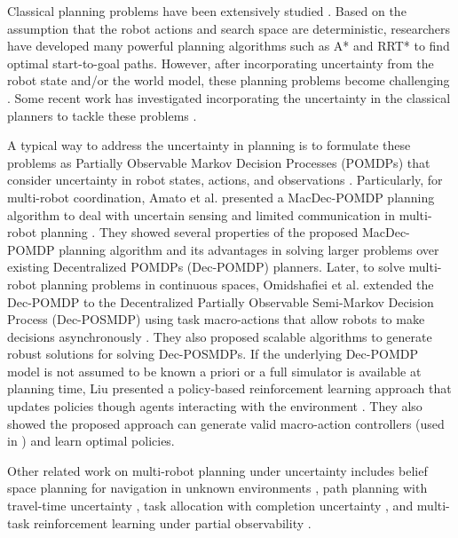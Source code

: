 Classical planning problems have been extensively studied \cite{lavalle2006planning}. Based on the assumption that the robot actions and search space are deterministic, researchers have developed many powerful planning algorithms such as A* \cite{hart1968formal} and RRT* \cite{karaman2011sampling} to find optimal start-to-goal paths. However, after incorporating uncertainty from the robot state and/or the world model, these planning problems become challenging \cite{kochenderfer2015decision,chung2019risk}. Some recent work has investigated incorporating the uncertainty in the classical planners to tackle these problems \cite{hollinger2016learning,toubeh2019risk}. 

A typical way to address the uncertainty in planning is to formulate these problems as Partially Observable Markov Decision Processes (POMDPs) that consider uncertainty in robot states, actions, and observations \cite{monahan1982state,oliehoek2016concise}. Particularly, for multi-robot coordination, Amato et al. presented a MacDec-POMDP planning algorithm to deal with uncertain sensing and limited communication in multi-robot planning \cite{amato2016policy}. They showed several  properties of the proposed MacDec-POMDP planning algorithm and its advantages in solving larger problems over existing Decentralized POMDPs (Dec-POMDP) planners. Later, to solve multi-robot planning problems in continuous spaces, Omidshafiei et al. extended the Dec-POMDP to the Decentralized Partially Observable Semi-Markov Decision Process (Dec-POSMDP) using task macro-actions that allow robots to make decisions asynchronously \cite{omidshafiei2017decentralized}. They also proposed scalable algorithms to generate robust solutions for solving Dec-POSMDPs. If the underlying Dec-POMDP model is not assumed to be known a priori or a full simulator is available at planning time, Liu presented a policy-based reinforcement learning approach that updates policies though agents interacting with the environment \cite{liu2016learning}. They also showed the proposed approach can generate valid macro-action controllers (used in \cite{amato2016policy,omidshafiei2017decentralized,amato2019modeling}) and learn optimal policies.  

Other related work on multi-robot planning under uncertainty includes belief space planning for navigation in unknown environments \cite{indelman2018cooperative}, path planning with travel-time uncertainty \cite{peltzer2020stt}, task allocation with completion uncertainty \cite{choudhury2020dynamic}, and multi-task
reinforcement learning under partial observability \cite{omidshafiei2017deep}. 


